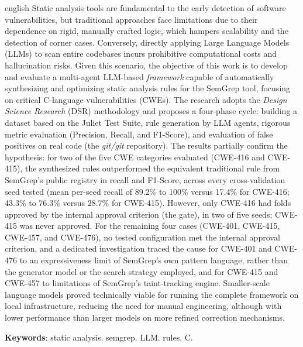 \documentclass[
    12pt,                %
    openright,           %
    oneside,             %
    a4paper,             %
    english,             %
    brazil               %
]{abntex2}
\begin{document}
\begin{resumo}[Abstract]
 \begin{otherlanguage*}{english}
   Static analysis tools are fundamental to the early detection of software vulnerabilities, but traditional approaches face limitations due to their dependence on rigid, manually crafted logic, which hampers scalability and the detection of corner cases.
Conversely, directly applying Large Language Models (LLMs) to scan entire codebases incurs prohibitive computational costs and hallucination risks.
Given this scenario, the objective of this work is to develop and evaluate a multi-agent LLM-based \textit{framework} capable of automatically synthesizing and optimizing static analysis rules for the SemGrep tool, focusing on critical C-language vulnerabilities (CWEs).
The research adopts the \textit{Design Science Research} (DSR) methodology and proposes a four-phase cycle: building a dataset based on the Juliet Test Suite, rule generation by LLM agents, rigorous metric evaluation (Precision, Recall, and F1-Score), and evaluation of false positives on real code (the \textit{git/git} repository).
The results partially confirm the hypothesis: for two of the five CWE categories evaluated (CWE-416 and CWE-415), the synthesized rules outperformed the equivalent traditional rule from SemGrep's public registry in recall and F1-Score, across every cross-validation seed tested (mean per-seed recall of 89.2\% to 100\% versus 17.4\% for CWE-416; 43.3\% to 76.3\% versus 28.7\% for CWE-415).
However, only CWE-416 had folds approved by the internal approval criterion (the gate), in two of five seeds; CWE-415 was never approved.
For the remaining four cases (CWE-401, CWE-415, CWE-457, and CWE-476), no tested configuration met the internal approval criterion, and a dedicated investigation traced the cause for CWE-401 and CWE-476 to an expressiveness limit of SemGrep's own pattern language, rather than the generator model or the search strategy employed, and for CWE-415 and CWE-457 to limitations of SemGrep's taint-tracking engine.
Smaller-scale language models proved technically viable for running the complete framework on local infrastructure, reducing the need for manual engineering, although with lower performance than larger models on more refined correction mechanisms.

   \vspace{\onelineskip}

   \noindent
   \textbf{Keywords}: static analysis. semgrep. LLM. rules. C.
 \end{otherlanguage*}
\end{resumo}
\end{document}
